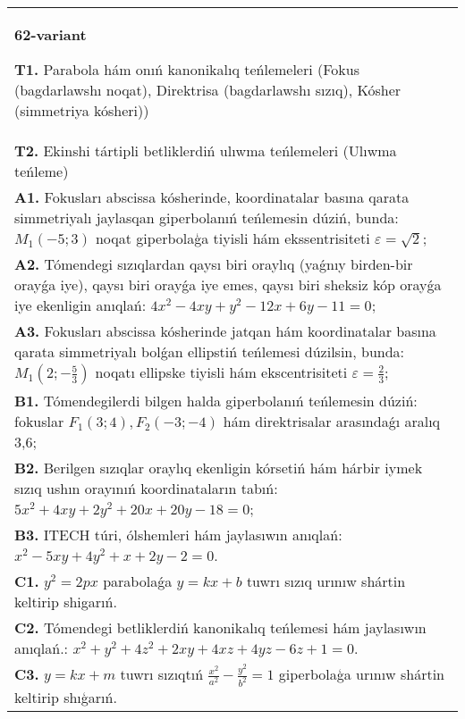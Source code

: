 \documentclass{article}
\begin{document}
\begin{tabular}{m{17cm}}
\textbf{62-variant}
\newline

\textbf{T1.} Parabola hám onıń kanonikalıq teńlemeleri (Fokus (bagdarlawshı noqat), Direktrisa (bagdarlawshı sızıq), Kósher (simmetriya kósheri)) \\
\textbf{T2.} Ekinshi tártipli betliklerdiń ulıwma teńlemeleri (Ulıwma teńleme) \\
\textbf{A1.} Fokusları abscissa kósherinde, koordinatalar basına qarata simmetriyalı jaylasqan giperbolanıń teńlemesin dúziń, bunda: $M_1 (-5; 3)$ noqat giperbolaģa tiyisli hám ekssentrisiteti $\varepsilon=\sqrt{2}$; \\
\textbf{A2.} Tómendegi sızıqlardan qaysı biri oraylıq (yaǵnıy birden-bir orayǵa iye), qaysı biri orayǵa iye emes, qaysı biri sheksiz kóp orayǵa iye ekenligin anıqlań: $4 x^2-4 x y+y^2-12 x+6 y-11=0$; \\
\textbf{A3.} Fokusları abscissa kósherinde jatqan hám koordinatalar basına qarata simmetriyalı bolǵan ellipstiń teńlemesi dúzilsin, bunda: $M_1 \left(2;-\frac{5}{3}\right) $ noqatı ellipske tiyisli hám ekscentrisiteti $\varepsilon=\frac{2}{3}$; \\
\textbf{B1.} Tómendegilerdi bilgen halda giperbolanıń teńlemesin dúziń: fokuslar $F_1 (3; 4), F_2 (-3;-4) $ hám direktrisalar arasındaǵı aralıq 3,6; \\
\textbf{B2.} Berilgen sızıqlar oraylıq ekenligin kórsetiń hám hárbir iymek sızıq ushın orayınıń koordinataların tabıń:$5 x^2+4 x y+2 y^2+20 x+20 y-18=0$; \\
\textbf{B3.} ITECH túri, ólshemleri hám jaylasıwın anıqlań: $x^2-5 x y+4 y^2+x+2 y-2=0$. \\
\textbf{C1.} $y^2=2 p x$ parabolaǵa $y=k x+b$ tuwrı sızıq urınıw shártin keltirip shigarıń. \\
\textbf{C2.} Tómendegi betliklerdiń kanonikalıq teńlemesi hám jaylasıwın anıqlań.: $x^2+y^2+4 z^2+2 x y+4 x z+4 y z-6 z+1=0$. \\
\textbf{C3.} $y=k x+m$ tuwrı sızıqtıń $\frac{x^2}{a^2}-\frac{y^2}{b^2}=1$ giperbolaģa urınıw shártin keltirip shıģarıń. \\

\end{tabular}
\vspace{1cm}
\end{document}

